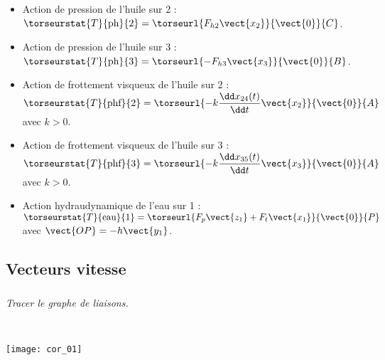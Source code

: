 \begin{multicols}{2}
\footnotesize
\begin{itemize}
\item Action de pression de l'huile sur 2 : $\torseurstat{T}{\text{ph}}{2}=\torseurl{F_{h2}\vect{x_2}}{\vect{0}}{C}$.
\item Action de pression de l'huile sur 3 : $\torseurstat{T}{\text{ph}}{3}=\torseurl{-F_{h3}\vect{x_3}}{\vect{0}}{B}$.
\item Action de frottement visqueux de l'huile sur 2 : $\torseurstat{T}{\text{phf}}{2}=\torseurl{-k\dfrac{\dd x_{24}(t)}{\dd t}\vect{x_2}}{\vect{0}}{A}$ avec $k>0$.
\item Action de frottement visqueux de l'huile sur 3 : $\torseurstat{T}{\text{phf}}{3}=\torseurl{-k\dfrac{\dd x_{35}(t)}{\dd t}\vect{x_3}}{\vect{0}}{A}$ avec $k>0$.
\item Action hydraudynamique de l'eau sur 1 : $\torseurstat{T}{\text{eau}}{1}=\torseurl{F_p\vect{z_1}+F_t\vect{x_1}}{\vect{0}}{P}$ avec $\vect{OP}=-h\vect{y_1}$.
\end{itemize}

\normalsize
%
%
%
%
%




\fi



\ifnormal

\subsection*{Vecteurs vitesse}

\subparagraph{}\textit{Tracer le graphe de liaisons.}
\ifprof
\begin{corrige} ~\\

\begin{center}
\texttt{[image: cor\_01]}
\end{center}
\end{corrige}
\else
\fi




\end{multicols}

